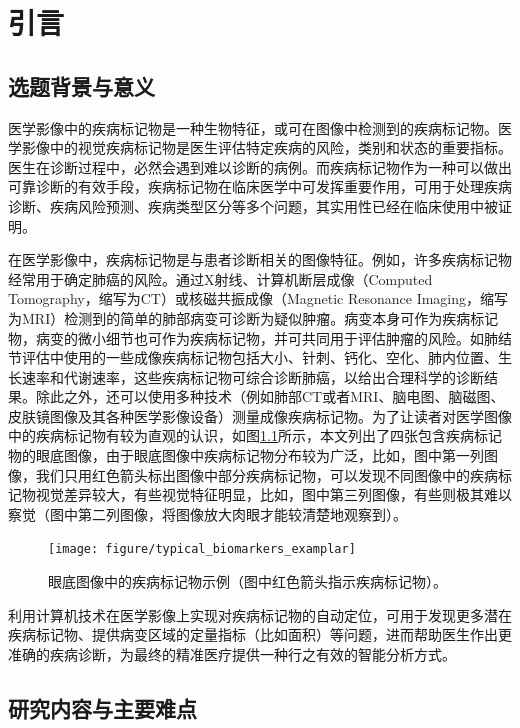 \chapter{引言}\label{cha:introduction}
\section{选题背景与意义}
\label{sec:background}
医学影像中的疾病标记物是一种生物特征，或可在图像中检测到的疾病标记物。医学影像中的视觉疾病标记物是医生评估特定疾病的风险，类别和状态的重要指标。医生在诊断过程中，必然会遇到难以诊断的病例。而疾病标记物作为一种可以做出可靠诊断的有效手段，疾病标记物在临床医学中可发挥重要作用，可用于处理疾病诊断、疾病风险预测、疾病类型区分等多个问题，其实用性已经在临床使用中被证明。

在医学影像中，疾病标记物是与患者诊断相关的图像特征。例如，许多疾病标记物经常用于确定肺癌的风险。通过X射线、计算机断层成像（Computed Tomography，缩写为CT）或核磁共振成像（Magnetic Resonance Imaging，缩写为MRI）检测到的简单的肺部病变可诊断为疑似肿瘤。病变本身可作为疾病标记物，病变的微小细节也可作为疾病标记物，并可共同用于评估肿瘤的风险。如肺结节评估中使用的一些成像疾病标记物包括大小、针刺、钙化、空化、肺内位置、生长速率和代谢速率，这些疾病标记物可综合诊断肺癌，以给出合理科学的诊断结果。除此之外，还可以使用多种技术（例如肺部CT或者MRI、脑电图、脑磁图、皮肤镜图像及其各种医学影像设备）测量成像疾病标记物。为了让读者对医学图像中的疾病标记物有较为直观的认识，如图\ref{mul_fig:medical_imaging_biomarkers_examplar}所示，本文列出了四张包含疾病标记物的眼底图像，由于眼底图像中疾病标记物分布较为广泛，比如，图中第一列图像，我们只用红色箭头标出图像中部分疾病标记物，可以发现不同图像中的疾病标记物视觉差异较大，有些视觉特征明显，比如，图中第三列图像，有些则极其难以察觉（图中第二列图像，将图像放大肉眼才能较清楚地观察到）。
\begin{figure}[h]
	\centering
	\texttt{[image: figure/typical\_biomarkers\_examplar]}
	\caption[眼底图像中的疾病标记物示例]{眼底图像中的疾病标记物示例（图中红色箭头指示疾病标记物）。}
	\label{mul_fig:medical_imaging_biomarkers_examplar}
\end{figure}

利用计算机技术在医学影像上实现对疾病标记物的自动定位，可用于发现更多潜在疾病标记物、提供病变区域的定量指标（比如面积）等问题，进而帮助医生作出更准确的疾病诊断，为最终的精准医疗提供一种行之有效的智能分析方式。
\vspace{-0.5cm}
\section{研究内容与主要难点}\label{sec:existing_diffcuities}
